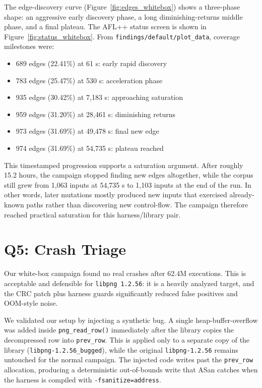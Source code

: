 \documentclass[letterpaper,twocolumn,10pt]{article}
\begin{document}
The edge-discovery curve (Figure~\ref{fig:edges_whitebox}) shows a three-phase shape:
an aggressive early discovery phase, a long diminishing-returns middle phase, and a final plateau.
The AFL++ status screen is shown in Figure~\ref{fig:status_whitebox}.
From \texttt{findings/default/plot\_data}, coverage milestones were:
\begin{itemize}
  \item 689 edges (22.41\%) at 61 s: early rapid discovery
  \item 783 edges (25.47\%) at 530 s: acceleration phase
  \item 935 edges (30.42\%) at 7,183 s: approaching saturation
  \item 959 edges (31.20\%) at 28,461 s: diminishing returns
  \item 973 edges (31.69\%) at 49,478 s: final new edge
  \item 974 edges (31.69\%) at 54,735 s: plateau reached
\end{itemize}

This timestamped progression supports a saturation argument. After roughly 15.2 hours,
the campaign stopped finding new edges altogether, while the corpus still grew from 1,063
inputs at 54,735 s to 1,103 inputs at the end of the run. In other words, later mutations
mostly produced new inputs that exercised already-known paths rather than discovering new
control-flow. The campaign therefore reached practical saturation for this harness/library pair.

\section{Q5: Crash Triage}

Our white-box campaign found no real crashes after 62.4M executions. This is
acceptable and defensible for \texttt{libpng 1.2.56}: it is a heavily analyzed
target, and the CRC patch plus harness guards significantly reduced false
positives and OOM-style noise.

We validated our setup by injecting a synthetic bug. A single heap-buffer-overflow
was added inside \texttt{png\_read\_row()} immediately after the library copies the
decompressed row into \texttt{prev\_row}. This is applied only to a separate copy
of the library (\texttt{libpng-1.2.56\_bugged}), while the original
\texttt{libpng-1.2.56} remains untouched for the normal campaign. The injected
code writes past the \texttt{prev\_row} allocation, producing a deterministic
out-of-bounds write that ASan catches when the harness is compiled with
\texttt{-fsanitize=address}.
\end{document}
